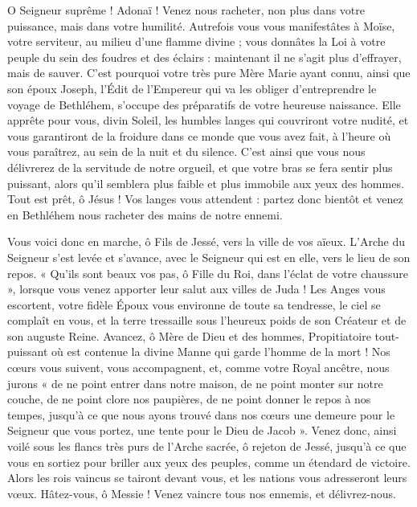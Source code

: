 \documentclass[%
fontsize=10%
,a6paper%
,DIV=13%
]{scrartcl}
\begin{document}
O Seigneur suprême ! Adonaï ! Venez nous racheter, non plus dans votre puissance, mais dans votre humilité. Autrefois vous vous manifestâtes à Moïse, votre serviteur, au milieu d’une flamme divine ; vous donnâtes la Loi à votre peuple du sein des foudres et des éclairs : maintenant il ne s’agit plus d’effrayer, mais de sauver. C’est pourquoi votre très pure Mère Marie ayant connu, ainsi que son époux Joseph, l’Édit de l’Empereur qui va les obliger d’entreprendre le voyage de Bethléhem, s’occupe des préparatifs de votre heureuse naissance. Elle apprête pour vous, divin Soleil, les humbles langes qui couvriront votre nudité, et vous garantiront de la froidure dans ce monde que vous avez fait, à l’heure où vous paraîtrez, au sein de la nuit et du silence. C’est ainsi que vous nous délivrerez de la servitude de notre orgueil, et que votre bras se fera sentir plus puissant, alors qu’il semblera plus faible et plus immobile aux yeux des hommes. Tout est prêt, ô Jésus ! Vos langes vous attendent : partez donc bientôt et venez en Bethléhem nous racheter des mains de notre ennemi.


Vous voici donc en marche, ô Fils de Jessé, vers la ville de vos aïeux. L’Arche du Seigneur s’est levée et s’avance, avec le Seigneur qui est en elle, vers le lieu de son repos. « Qu’ils sont beaux vos pas, ô Fille du Roi, dans l’éclat de votre chaussure », lorsque vous venez apporter leur salut aux villes de Juda ! Les Anges vous escortent, votre fidèle Époux vous environne de toute sa tendresse, le ciel se complaît en vous, et la terre tressaille sous l’heureux poids de son Créateur et de son auguste Reine. Avancez, ô Mère de Dieu et des hommes, Propitiatoire tout-puissant où est contenue la divine Manne qui garde l’homme de la mort ! Nos cœurs vous suivent, vous accompagnent, et, comme votre Royal ancêtre, nous jurons « de ne point entrer dans notre maison, de ne point monter sur notre couche, de ne point clore nos paupières, de ne point donner le repos à nos tempes, jusqu’à ce que nous ayons trouvé dans nos cœurs une demeure pour le Seigneur que vous portez, une tente pour le Dieu de Jacob ». Venez donc, ainsi voilé sous les flancs très purs de l’Arche sacrée, ô rejeton de Jessé, jusqu’à ce que vous en sortiez pour briller aux yeux des peuples, comme un étendard de victoire. Alors les rois vaincus se tairont devant vous, et les nations vous adresseront leurs vœux. Hâtez-vous, ô Messie ! Venez vaincre tous nos ennemis, et délivrez-nous.
\end{document}
